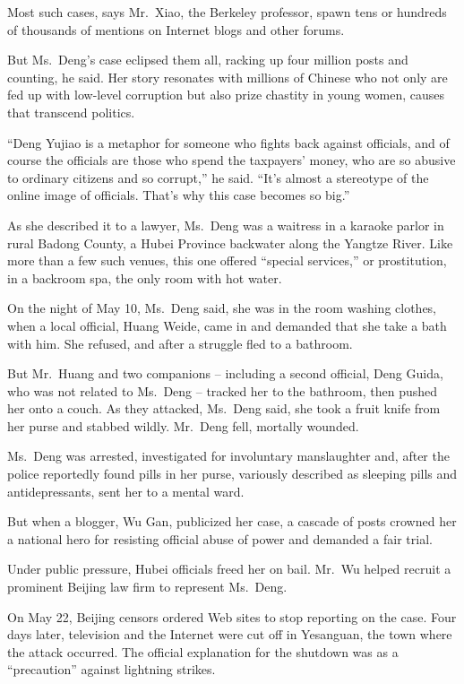 ﻿\documentclass[12pt,a4paper,onecolumn]{article}
\begin{document}
Most such cases, says Mr.~Xiao, the Berkeley professor, spawn tens or hundreds of thousands of
mentions on Internet blogs and other forums.

But Ms.~Deng's case eclipsed them all, racking up four million posts and counting, he said. Her
story resonates with millions of Chinese who not only are fed up with low-level corruption but also
prize chastity in young women, causes that transcend politics.

``Deng Yujiao is a metaphor for someone who fights back against officials, and of course the
officials are those who spend the taxpayers' money, who are so abusive to ordinary citizens and so
corrupt,'' he said. ``It's almost a stereotype of the online image of officials. That's why this
case becomes so big.''

As she described it to a lawyer, Ms.~Deng was a waitress in a karaoke parlor in rural Badong County,
a Hubei Province backwater along the Yangtze River. Like more than a few such venues, this one
offered ``special services,'' or prostitution, in a backroom spa, the only room with hot water.

On the night of May 10, Ms.~Deng said, she was in the room washing clothes, when a local official,
Huang Weide, came in and demanded that she take a bath with him. She refused, and after a struggle
fled to a bathroom.

But Mr.~Huang and two companions -- including a second official, Deng Guida, who was not related to
Ms.~Deng -- tracked her to the bathroom, then pushed her onto a couch. As they attacked, Ms.~Deng
said, she took a fruit knife from her purse and stabbed wildly. Mr.~Deng fell, mortally wounded.

Ms.~Deng was arrested, investigated for involuntary manslaughter and, after the police reportedly
found pills in her purse, variously described as sleeping pills and antidepressants, sent her to a
mental ward.

But when a blogger, Wu Gan, publicized her case, a cascade of posts crowned her a national hero for
resisting official abuse of power and demanded a fair trial.

Under public pressure, Hubei officials freed her on bail. Mr.~Wu helped recruit a prominent Beijing
law firm to represent Ms.~Deng.

On May 22, Beijing censors ordered Web sites to stop reporting on the case. Four days later,
television and the Internet were cut off in Yesanguan, the town where the attack occurred. The
official explanation for the shutdown was as a ``precaution'' against lightning strikes.
\end{document}
